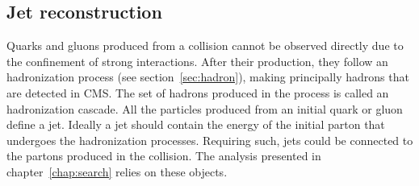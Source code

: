 %
%
%
%

\subsection{Jet reconstruction}
\label{sec:jets}

Quarks and gluons produced from a collision cannot be observed directly due to the confinement of strong interactions. After their production, they follow an hadronization process (see section~\ref{sec:hadron}), making principally hadrons that are detected in CMS. The set of hadrons produced in the process is called an hadronization cascade. All the particles produced from an initial quark or gluon define a jet. Ideally a jet should contain the energy of the initial parton that undergoes the hadronization processes. Requiring such, jets could be connected to the partons produced in the collision. The analysis presented in chapter~\ref{chap:search} relies on these objects.

